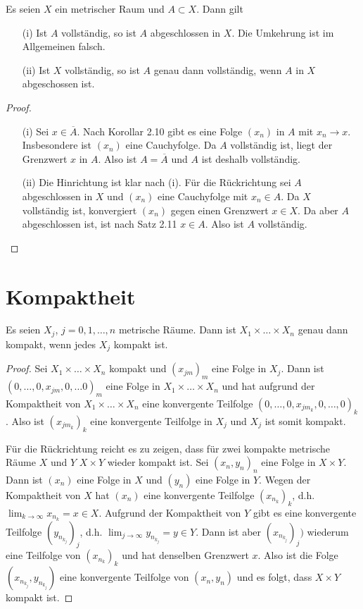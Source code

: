 \setcounter{aufgabe}{20}
\begin{aufgabe}
	Es seien $X$ ein metrischer Raum und $A \subset X$. Dann gilt
	\begin{enumerate}
		\item[(i)] Ist $A$ vollständig, so ist $A$ abgeschlossen in $X$. Die Umkehrung ist im Allgemeinen
			falsch.
		\item[(ii)] Ist $X$ vollständig, so ist $A$ genau dann vollständig, wenn $A$ in $X$
			abgeschossen ist.
	\end{enumerate}
\end{aufgabe}
\begin{proof}
	\begin{enumerate}
		\item[(i)] Sei $x \in \overline A$. Nach Korollar 2.10 gibt es eine Folge $(x_n)$ in $A$
			mit $x_n \to x$. Insbesondere ist $(x_n)$ eine Cauchyfolge. Da $A$ vollständig ist, 
			liegt der Grenzwert $x$ in $A$. Also ist $A = \overline A$ und $A$ ist deshalb vollständig.
		\item[(ii)] Die Hinrichtung ist klar nach (i). Für die Rückrichtung sei $A$ abgeschlossen
			in $X$ und $(x_n)$ eine Cauchyfolge mit $x_n \in A$. Da $X$ vollständig ist, konvergiert
			$(x_n)$ gegen einen Grenzwert $x \in X$. Da aber $A$ abgeschlossen ist, ist nach
			Satz 2.11 $x \in A$. Also ist $A$ vollständig.
	\end{enumerate}
\end{proof}


\section{Kompaktheit}
\begin{aufgabe}
	Es seien $X_j$, $j = 0,1, \ldots, n$ metrische Räume. Dann ist $X_1 \times \dots \times X_n$ genau
	dann kompakt, wenn jedes $X_j$ kompakt ist.
\end{aufgabe}
\begin{proof}
	Sei $X_1 \times \dots \times X_n$ kompakt und $(x_{jm})_m$ eine Folge in $X_j$. Dann ist
	$(0, \ldots, 0, x_{jm}, 0, \ldots 0)_m$ eine Folge in $X_1 \times \dots \times X_n$ und hat
	aufgrund der Kompaktheit von $X_1 \times \dots \times X_n$ eine konvergente Teilfolge
	$(0, \ldots, 0, x_{jm_k}, 0, \ldots, 0)_k$. Also ist $(x_{jm_k})_k$ eine konvergente Teilfolge
	in $X_j$ und $X_j$ ist somit kompakt.

	Für die Rückrichtung reicht es zu zeigen, dass für zwei kompakte metrische Räume $X$ und $Y$
	$X \times Y$ wieder kompakt ist. Sei $(x_n, y_n)_n$ eine Folge in $X \times Y$. Dann ist
	$(x_n)$ eine Folge in $X$ und $(y_n)$ eine Folge in $Y$. Wegen der Kompaktheit von 
	$X$ hat $(x_n)$ eine konvergente Teilfolge $(x_{n_k})_k$, d.h.
	$\displaystyle \lim_{k \to \infty} x_{n_k} = x \in X$. Aufgrund der Kompaktheit von $Y$ gibt
	es eine konvergente Teilfolge $(y_{n_{k_j}})_j$, d.h.
	$\displaystyle \lim_{j \to \infty} y_{n_{k_j}} = y \in Y$.
	Dann ist aber $(x_{n_{k_j}})_j)$ wiederum eine Teilfolge von $(x_{n_k})_k$ und hat
	denselben Grenzwert $x$. Also ist die Folge $(x_{n_{k_j}}, y_{n_{k_j}})$ eine 
	konvergente Teilfolge von $(x_n, y_n)$ und es folgt, dass $X \times Y$ kompakt ist.
\end{proof}

